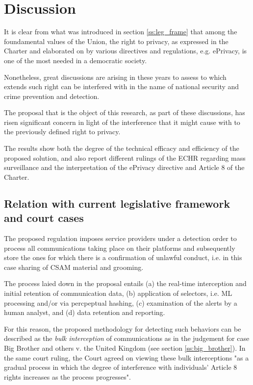 \section{Discussion}

It is clear from what was introduced in section \ref{ss:leg_frame} that among the foundamental values of the Union, the right to privacy, as expressed in the Charter and elaborated on by various directives and regulations, e.g. ePrivacy, is one of the most needed in a democratic society. 

Nonetheless, great discussions are arising in these years to assess to which extends such right can be interfered with in the name of national security and crime prevention and detection. 

The proposal that is the object of this research, as part of these discussions, has risen significant concern in light of the interference that it might cause with to the previously defined right to privacy.

The results show both the degree of the technical efficacy and efficiency of the proposed solution, and also report different rulings of the ECHR regarding mass surveillance and the interpretation of the ePrivacy directive and Article 8 of the Charter. 

\subsection{Relation with current legislative framework and court cases}
\label{ss:relation_leg}

The proposed regulation imposes service providers under a detection order to process all communications taking place on their platforms and subsequently store the ones for which there is a confirmation of unlawful conduct, i.e. in this case sharing of CSAM material and grooming.

The process laied down in the proposal entails (a) the real-time interception and initial retention of communication data, (b) application of selectors, i.e. ML processing and/or via percpeptual hashing, (c) examination of the alerts by a human analyst, and (d) data retention and reporting. 

For this reason, the proposed methodology for detecting such behaviors can be described as the \textit{bulk interception} of communications as in the judgement for case Big Brother and others v. the United Kingdom (see section \ref{ss:big_brother}). In the same court ruling, the Court agreed on viewing these bulk interceptions "as a gradual process in which the degree of interference with individuals' Article 8 rights increases as the process progresses"\cite{big_brother}.

